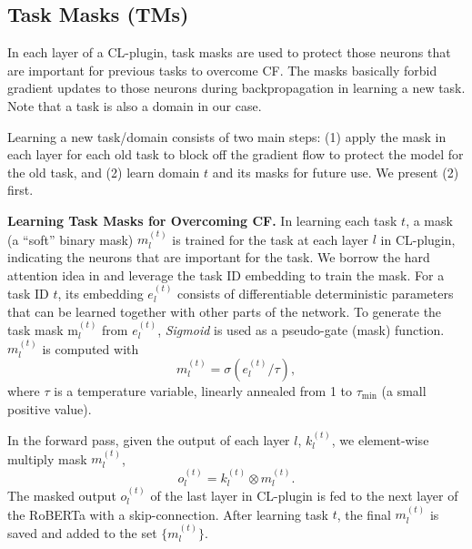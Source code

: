 \documentclass[11pt]{article}
\begin{document}
\subsection{Task Masks (TMs)} 
\label{sec:task_mask}






In each layer of a CL-plugin, task masks are used to protect those neurons that are important for previous tasks to overcome CF. The masks basically forbid gradient updates to those neurons during backpropagation in learning a new task. Note that a task is also a domain in our case.

Learning a new task/domain consists of two main steps: (1) apply the mask in each layer for each old task to block off the gradient flow to protect the model for the old task, and (2) learn domain $t$ and its masks for future use. We present (2) first.  
 











\textbf{Learning Task Masks for Overcoming CF.} In learning each task $t$, a mask (a ``soft'' binary mask) ${m}^{(t)}_l$ is trained for the task at each layer $l$ in CL-plugin, indicating the neurons that are important for the task. We borrow the hard attention idea in \cite{Serra2018overcoming} and leverage the task ID embedding to train the mask. For a task ID $t$, its embedding $e^{(t)}_l$ consists of differentiable deterministic parameters that can be learned together with other parts of the network. 
To generate the task mask $\text{m}^{(t)}_l$ from $e^{(t)}_l$, \textit{Sigmoid} is used as a pseudo-gate (mask) function. $m^{(t)}_l$ is computed with
\begin{equation}
\label{eq:mask}
m^{(t)}_l = \sigma(e^{(t)}_l/\tau),
\end{equation}
where $\tau$ is a temperature variable, linearly annealed from 1 to $\tau_{\min}$ (a small positive value). 

In the forward pass, given the output of each layer $l$, $k_l^{(t)}$, we element-wise multiply mask $m^{(t)}_l$,
\begin{equation}
\label{eq:forward}
o_l^{(t)} = k_l^{(t)} \otimes m^{(t)}_l.
\end{equation}
{The masked output $o_l^{(t)}$ of the last layer in CL-plugin is} fed to the next layer of the RoBERTa with a skip-connection. After learning task $t$, the final $m^{(t)}_l$ is saved and added to the set $\{m^{(t)}_l\}$.
\end{document}

